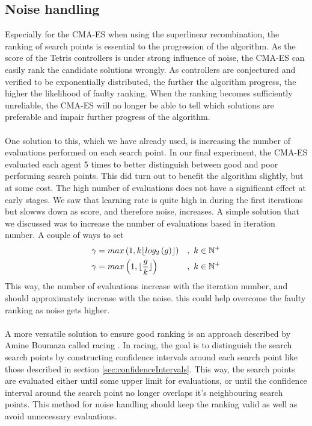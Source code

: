 \subsection{Noise handling}

Especially for the CMA-ES when using the superlinear recombination, the ranking of search
points is essential to the progression of the algorithm. As the score of the Tetris controllers
is under strong influence of noise, the CMA-ES can easily rank the 
candidate solutions wrongly. As controllers are conjectured and verified to
be exponentially distributed, the further the algorithm progress, the higher the likelihood
of faulty ranking. When the ranking becomes sufficiently unreliable, the CMA-ES will
no longer be able to tell which solutions are preferable and impair further progress
of the algorithm.\\
\\
One solution to this, which we have already used, is increasing the number of evaluations
performed on each search point. In our final experiment, the CMA-ES evaluated each agent
5 times to better distinguish between good and poor performing search points. This did turn out
to benefit the algorithm slightly, but at some cost. The high number of evaluations does not have a
significant effect at early stages. We saw that learning rate is quite high in during the first 
iterations but slowws down as score, and therefore noise, increases. A simple solution
that we discussed  was to increase the number of evaluations based in iteration number.
A couple of ways to set 
\begin{align}
\gamma &=  max\left( 1, k \lfloor log_{2} \left( g \right)  \rfloor \right) &,\ k \in \mathbb{N}^+\\
\gamma &=  max\left( 1, \lfloor \frac{g}{k} \rfloor \right) &,\ k \in \mathbb{N}^+
\end{align}
This way, the number of evaluations increase with the iteration number, and should approximately
increase with the noise. this could help overcome the faulty ranking as noise gets higher.\\
\\
A more versatile solution to ensure good ranking is an approach described by
Amine Boumaza called racing \citep{boumaza2011:b}. In racing, the goal is to 
distinguish the search search points by constructing confidence intervals around each
search point like those described in section \ref{sec:confidenceIntervals}.
This way, the search points are evaluated either until some upper limit for evaluations,
or until the confidence interval around the search point no longer overlaps it's
neighbouring search points. This method for noise handling should keep the ranking 
valid as well as avoid unnecessary evaluations.


